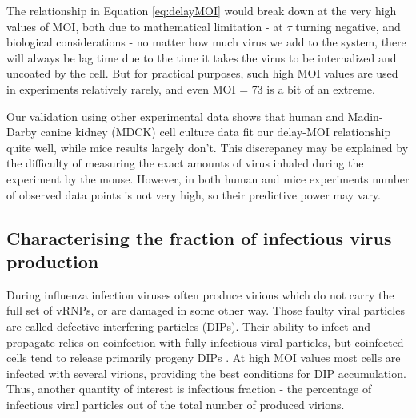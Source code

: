 The relationship in Equation \ref{eq:delayMOI} would break down at the very high values of MOI, both due to mathematical limitation - at $\tau$ turning negative, and biological considerations - no matter how much virus we add to the system, there will always be lag time due to the time it takes the virus to be internalized and uncoated by the cell. But for practical purposes, such high MOI values are used in experiments relatively rarely, and even MOI = 73 is a bit of an extreme.

Our validation using other experimental data shows that human and Madin-Darby canine kidney (MDCK) cell culture data fit our delay-MOI relationship quite well, while mice results largely don't. This discrepancy may be explained by the difficulty of measuring the exact amounts of virus inhaled during the experiment by the mouse. However, in both human and mice experiments number of observed data points is not very high, so their predictive power may vary.

\subsection{Characterising the fraction of infectious virus production}

During influenza infection viruses often produce virions which do not carry the full set of vRNPs, or are damaged in some other way. Those faulty viral particles are called defective interfering particles (DIPs). Their ability to infect and propagate relies on coinfection with fully infectious viral particles, but coinfected cells tend to release primarily progeny DIPs \cite{frensing2014impact}. At high MOI values most cells are infected with several virions, providing the best conditions for DIP accumulation. Thus, another quantity of interest is infectious fraction - the percentage of infectious viral particles out of the total number of produced virions.

